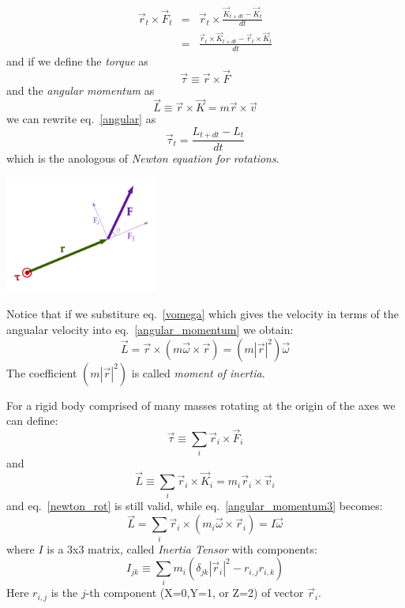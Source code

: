 \documentclass[12pt]{article}
\begin{document}
\begin{eqnarray}
\vec r_t \times \vec F_t &=& \vec r_t \times \frac{\vec  K_{t+dt}-\vec  K_t}{dt} \\
&=&  \frac{\vec r_t \times\vec K_{t+dt}-\vec r_t \times \vec  K_t}{dt}
\label{angular}
\end{eqnarray}
and if we define the {\it torque} as
\begin{equation}
\vec \tau \equiv \vec r \times \vec F
\end{equation}
and the {\it angular momentum} as
\begin{equation}
\vec L \equiv \vec r \times \vec K = m  \vec r \times \vec v
\label{angular_momentum}
\end{equation}
we can rewrite eq.~\ref{angular} as 
\begin{equation}
\vec \tau_ t = \frac{L_{t+dt}-L_t}{dt}
\label{newton_rot}
\end{equation}
which is the anologous of {\it Newton equation for rotations}.

\begin{center}
\includegraphics[width=5cm]{images/torque.png}
\end{center}

Notice that if we substiture eq.~\ref{vomega} which gives the velocity in terms of the angualar velocity into eq.~\ref{angular_momentum} we obtain:
\begin{equation}
\vec L = \vec r \times (m \vec \omega \times \vec r) = (m |\vec r|^2) \vec \omega
\label{angular_momentum2}
\end{equation}
The coefficient $(m |\vec r|^2)$ is called {\it moment of inertia}.

For a rigid body comprised of many masses rotating at the origin of the axes we can define:
\begin{equation}
\vec \tau \equiv \sum_i \vec r_i \times \vec F_i
\end{equation}
and
\begin{equation}
\vec L \equiv \sum_i \vec r_i \times \vec K_i = m_i  \vec r_i \times \vec v_i
\label{angular_momentum3}
\end{equation}
and eq.~\ref{newton_rot} is still valid, while eq.~\ref{angular_momentum3} becomes:
\begin{equation}
\vec L = \sum _i \vec r_i \times (m_i \vec \omega \times \vec r_i) = I \vec \omega
\label{angular_momentum4}
\end{equation}
where $I$ is a 3x3 matrix, called {\it Inertia Tensor} with components:
\begin{equation}
I_{jk} \equiv \sum_i m_i (\delta_{jk} |\vec r_i|^2 - r_{i,j} r_{i,k})
\label{momentum_inertia}
\end{equation}
Here $r_{i,j}$ is the $j$-th component (X=0,Y=1, or Z=2) of vector $\vec r_i$.
\end{document}

